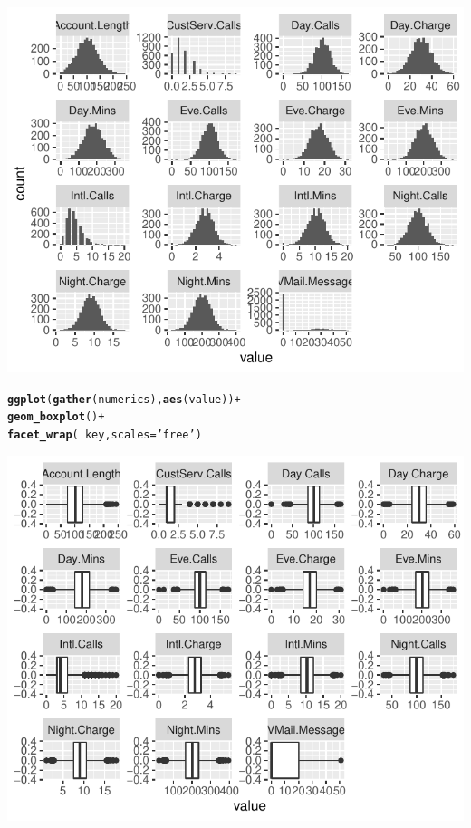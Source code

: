 \documentclass{article}\usepackage[]{graphicx}\usepackage[]{color}
\makeatletter
\def\maxwidth{ %
  \ifdim\Gin@nat@width>\linewidth
    \linewidth
  \else
    \Gin@nat@width
  \fi
}
\newcommand{\hlstr}[1]{\textcolor[rgb]{0.192,0.494,0.8}{#1}}%
\newcommand{\hlopt}[1]{\textcolor[rgb]{0,0,0}{#1}}%
\newcommand{\hlstd}[1]{\textcolor[rgb]{0.345,0.345,0.345}{#1}}%
\newcommand{\hlkwc}[1]{\textcolor[rgb]{0.333,0.667,0.333}{#1}}%
\newcommand{\hlkwd}[1]{\textcolor[rgb]{0.737,0.353,0.396}{\textbf{#1}}}%
\newenvironment{kframe}{%
 \def\at@end@of@kframe{}%
 \ifinner\ifhmode%
  \def\at@end@of@kframe{\end{minipage}}%
  \begin{minipage}{\columnwidth}%
 \fi\fi%
 \def\FrameCommand##1{\hskip\@totalleftmargin \hskip-\fboxsep
 \colorbox{shadecolor}{##1}\hskip-\fboxsep
     \hskip-\linewidth \hskip-\@totalleftmargin \hskip\columnwidth}%
 \MakeFramed {\advance\hsize-\width
   \@totalleftmargin\z@ \linewidth\hsize
   \@setminipage}}%
 {\par\unskip\endMakeFramed%
 \at@end@of@kframe}
\newenvironment{knitrout}{}{} %
\makeatother
\begin{document}
\begin{description}
\begin{knitrout}
\begin{kframe}
{\ttfamily\noindent\itshape\color{messagecolor}{\#\# `stat\_bin()` using `bins = 30`. Pick better value with `binwidth`.}}\end{kframe}

{\centering \includegraphics[width=\maxwidth]{figure/Overviews_plots-2} 

}


\begin{kframe}\begin{alltt}
\hlkwd{ggplot}\hlstd{(}\hlkwd{gather}\hlstd{(numerics),} \hlkwd{aes}\hlstd{(value))} \hlopt{+}
  \hlkwd{geom_boxplot}\hlstd{()} \hlopt{+}
  \hlkwd{facet_wrap}\hlstd{(}\hlopt{~}\hlstd{key,} \hlkwc{scales}\hlstd{=}\hlstr{'free'}\hlstd{)}
\end{alltt}
\end{kframe}

{\centering \includegraphics[width=\maxwidth]{figure/Overviews_plots-3} 

}
\end{knitrout}
\end{description}
\end{document}
